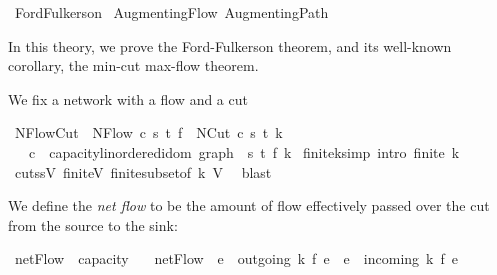 %
\begin{isabellebody}%
%
%
\isamarkuptrue%
%
\isadelimtheory
%
\endisadelimtheory
%
\isatagtheory
{}\isamarkupfalse%
\ Ford{\isacharunderscore}Fulkerson\isanewline
{}\ Augmenting{\isacharunderscore}Flow\ Augmenting{\isacharunderscore}Path\isanewline
{}%
\endisatagtheory
{\isafoldtheory}%
%
\isadelimtheory
%
\endisadelimtheory
%
\begin{isamarkuptext}%
In this theory, we prove the Ford-Fulkerson theorem, 
  and its well-known corollary, the min-cut max-flow theorem.%
\end{isamarkuptext}\isamarkuptrue%
%
\begin{isamarkuptext}%
We fix a network with a flow and a cut%
\end{isamarkuptext}\isamarkuptrue%
\isamarkupfalse%
\ NFlowCut\ {\isacharequal}\ NFlow\ c\ s\ t\ f\ {\isacharplus}\ NCut\ c\ s\ t\ k\ \isanewline
\ \ \ c\ {\isacharcolon}{\isacharcolon}\ {\isachardoublequoteopen}{\isacharprime}capacity{\isacharcolon}{\isacharcolon}linordered{\isacharunderscore}idom\ graph{\isachardoublequoteclose}\ \ s\ t\ f\ k\isanewline
{}\isanewline
\isanewline
{}\isamarkupfalse%
\ finite{\isacharunderscore}k{\isacharbrackleft}simp{\isacharcomma}\ intro{\isacharbang}{\isacharbrackright}{\isacharcolon}\ {\isachardoublequoteopen}finite\ k{\isachardoublequoteclose}\ \isanewline
%
\isadelimproof
\ \ %
\endisadelimproof
%
\isatagproof
{}\isamarkupfalse%
\ cut{\isacharunderscore}ss{\isacharunderscore}V\ finite{\isacharunderscore}V\ finite{\isacharunderscore}subset{\isacharbrackleft}of\ k\ V{\isacharbrackright}\ \isamarkupfalse%
\ blast%
\endisatagproof
{\isafoldproof}%
%
\isadelimproof
%
\endisadelimproof
%
\isamarkuptrue%
%
\begin{isamarkuptext}%
We define the \emph{net flow} to be the amount of flow effectively 
  passed over the cut from the source to the sink:%
\end{isamarkuptext}\isamarkuptrue%
\isamarkupfalse%
\ netFlow\ {\isacharcolon}{\isacharcolon}\ {\isachardoublequoteopen}{\isacharprime}capacity{\isachardoublequoteclose}\isanewline
\ \ \ {\isachardoublequoteopen}netFlow\ {\isasymequiv}\ {\isacharparenleft}{\isasymSum}e\ {\isasymin}\ outgoing{\isacharprime}\ k{\isachardot}\ f\ e{\isacharparenright}\ {\isacharminus}\ {\isacharparenleft}{\isasymSum}e\ {\isasymin}\ incoming{\isacharprime}\ k{\isachardot}\ f\ e{\isacharparenright}{\isachardoublequoteclose}%

\end{isabellebody}
